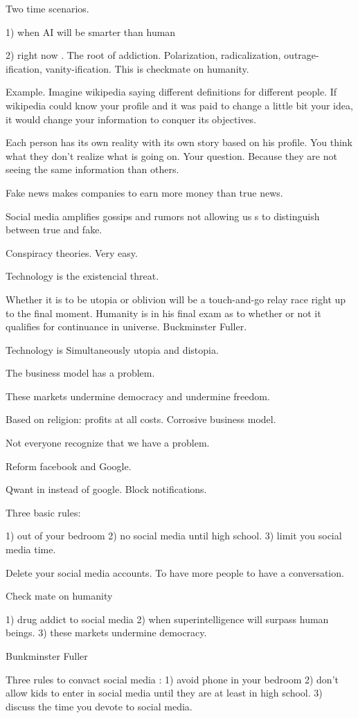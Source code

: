  Two time scenarios. 
 
 1) when AI will be smarter than human
 
 2) right now . The root of addiction.
  Polarization, radicalization, outrage-ification, vanity-ification. 
 This is checkmate on humanity. 
 
 Example. Imagine wikipedia saying different definitions for different people. If wikipedia could know your profile and it was paid to change 
 a little bit your idea, it would change your information to conquer its objectives. 
 
 Each person has its own reality with its own story based on his profile. 
 You think what they don't realize what is going on. Your question. Because they are not seeing the same information than others. 
 
 Fake news makes companies to earn more money than true news. 
 
 Social media amplifies gossips and rumors not allowing us s to distinguish between true and fake. 
 
 Conspiracy theories. Very easy. 
 
 Technology is the existencial threat. 
 
 Whether it is to be utopia or oblivion will be a touch-and-go relay race right up to the final moment. Humanity is in his final exam as to 
 whether or not it qualifies for continuance in universe. 
 Buckminster Fuller. 
 
 
 Technology is Simultaneously utopia and distopia. 
 
 The business model has a problem. 
 
 These markets undermine democracy and undermine freedom. 
 
 Based on religion: profits at all costs. Corrosive business model.  
 
 Not everyone recognize that we have a problem. 
 
 Reform facebook and Google. 
 
 Qwant in instead of google. Block notifications. 
 
 
 Three basic rules:
 
 1) out of your bedroom
 2) no social media until high school. 
 3) limit you social media time. 
 
 
 Delete your social media accounts. To have more people to have a conversation. 
 
 
 Check mate on humanity 
 
 1) drug addict to social media 
 2) when superintelligence will surpass human beings. 
 3) these markets undermine democracy. 
 
 Bunkminster Fuller 
 
 
 Three rules to convact social media :
 1) avoid phone in your bedroom
 2) don't allow kids to enter in social media until they are at least in high school. 
 3) discuss the time you devote to social media. 
 
 
 
 
 
 